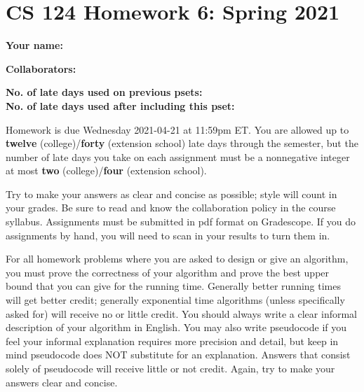\documentclass[11pt]{article}
\begin{document}
	
	\section*{CS 124 Homework 6: Spring 2021}
 		
	\textbf{Your name:} 
		
	\textbf{Collaborators:} 

	\textbf{No. of late days used on previous psets: }\\
	\textbf{No. of late days used after including this pset: }

Homework is due Wednesday 2021-04-21 at 11:59pm ET. You are allowed up to {\bf twelve} (college)/{\bf forty} (extension school) late days through the semester, but the number of late days you take on each assignment must be a nonnegative integer at most {\bf two} (college)/{\bf four} (extension school).

Try to make your answers as clear and concise as possible;
style will count in your grades. Be sure to read and know the collaboration policy in the course
syllabus. Assignments must be submitted in pdf format on Gradescope. If you do assignments by hand, you
will need to scan in your results to turn them in. 

For all homework problems where you are asked to design or give an algorithm, you must prove the correctness
of your algorithm and prove the best upper bound that you can give for the running time. Generally
better running times will get better credit; generally exponential time algorithms (unless specifically asked
for) will receive no or little credit. You should always write a clear informal description of your algorithm
in English. You may also write pseudocode if you feel your informal explanation requires more precision
and detail, but keep in mind pseudocode does NOT substitute for an explanation. Answers that consist
solely of pseudocode will receive little or not credit. Again, try to make your answers clear and concise.
\end{document}
